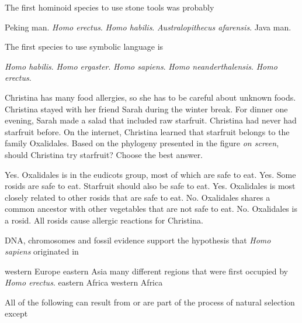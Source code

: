 \question
The first hominoid species to use stone tools was probably

\begin{choices}
\choice Peking man.
\choice \textit{Homo erectus}.
\correctchoice \textit{Homo habilis}.
\choice \textit{Australopithecus afarensis}.
\choice Java man.
\end{choices}

\question
The first species to use symbolic language is

\begin{choices}
\choice \textit{Homo habilis}.
\choice \textit{Homo ergaster}.
\correctchoice \textit{Homo sapiens}.
\choice \textit{Homo neanderthalensis}.
\choice \textit{Homo erectus}.
\end{choices}

\question
Christina has many food allergies, so she has to be careful about unknown foods.  Christina stayed with her friend Sarah during the winter break.  For dinner one evening, Sarah made a salad that included raw starfruit. Christina had never had starfruit before. On the internet, Christina learned that starfruit belongs to the family Oxalidales. Based on the phylogeny presented in the figure \textit{on screen}, should Christina try starfruit? Choose the best answer.

\begin{choices}
\choice Yes. Oxalidales is in the eudicots group, most of which are safe to eat.
\choice Yes. Some rosids are safe to eat. Starfruit should also be safe to eat.
\choice Yes. Oxalidales is most closely related to other rosids that are safe to eat.
\correctchoice No. Oxalidales shares a common ancestor with other vegetables that are not safe to eat.
\choice No. Oxalidales is a rosid. All rosids cause allergic reactions for Christina.
\end{choices}

\question
DNA, chromosomes and fossil evidence support the hypothesis that \textit{Homo sapiens} originated in

\begin{choices}
\choice western Europe
\choice eastern Asia
\choice many different regions that were first occupied by \textit{Homo erectus}.
\correctchoice eastern Africa
\choice western Africa
\end{choices}

\newpage

\question
All of the following can result from or are part of the process of natural selection except

